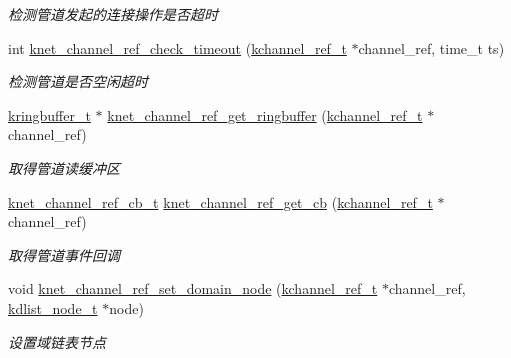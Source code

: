 \begin{DoxyCompactItemize}
\begin{DoxyCompactList}\small\item\em 检测管道发起的连接操作是否超时 \end{DoxyCompactList}\item 
int \hyperlink{a00049_acaa4747a62cce770cc798c2c30bf2670_acaa4747a62cce770cc798c2c30bf2670}{knet\+\_\+channel\+\_\+ref\+\_\+check\+\_\+timeout} (\hyperlink{a00051_a3b7e82599367eade261456f60ebe2cd9_a3b7e82599367eade261456f60ebe2cd9}{kchannel\+\_\+ref\+\_\+t} $\ast$channel\+\_\+ref, time\+\_\+t ts)
\begin{DoxyCompactList}\small\item\em 检测管道是否空闲超时 \end{DoxyCompactList}\item 
\hyperlink{a00051_a66d91f7667db1f0b2983fc25e1a20f1c_a66d91f7667db1f0b2983fc25e1a20f1c}{kringbuffer\+\_\+t} $\ast$ \hyperlink{a00049_a223616ac0204f928d4c85e2d59d98bda_a223616ac0204f928d4c85e2d59d98bda}{knet\+\_\+channel\+\_\+ref\+\_\+get\+\_\+ringbuffer} (\hyperlink{a00051_a3b7e82599367eade261456f60ebe2cd9_a3b7e82599367eade261456f60ebe2cd9}{kchannel\+\_\+ref\+\_\+t} $\ast$channel\+\_\+ref)
\begin{DoxyCompactList}\small\item\em 取得管道读缓冲区 \end{DoxyCompactList}\item 
\hyperlink{a00051_a8a7d96123ef4565c6d08fe58a10476a9_a8a7d96123ef4565c6d08fe58a10476a9}{knet\+\_\+channel\+\_\+ref\+\_\+cb\+\_\+t} \hyperlink{a00049_a51588a9377f745308695f9332c4e242f_a51588a9377f745308695f9332c4e242f}{knet\+\_\+channel\+\_\+ref\+\_\+get\+\_\+cb} (\hyperlink{a00051_a3b7e82599367eade261456f60ebe2cd9_a3b7e82599367eade261456f60ebe2cd9}{kchannel\+\_\+ref\+\_\+t} $\ast$channel\+\_\+ref)
\begin{DoxyCompactList}\small\item\em 取得管道事件回调 \end{DoxyCompactList}\item 
void \hyperlink{a00049_a9576bac459baba7c258ae8504f1fbad3_a9576bac459baba7c258ae8504f1fbad3}{knet\+\_\+channel\+\_\+ref\+\_\+set\+\_\+domain\+\_\+node} (\hyperlink{a00051_a3b7e82599367eade261456f60ebe2cd9_a3b7e82599367eade261456f60ebe2cd9}{kchannel\+\_\+ref\+\_\+t} $\ast$channel\+\_\+ref, \hyperlink{a00051_ac701f00a0851c97467ae35c382b316b7_ac701f00a0851c97467ae35c382b316b7}{kdlist\+\_\+node\+\_\+t} $\ast$node)
\begin{DoxyCompactList}\small\item\em 设置域链表节点 \end{DoxyCompactList}\item 

\end{DoxyCompactItemize}
